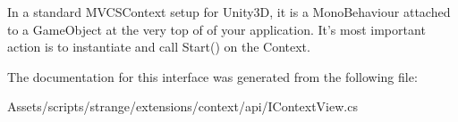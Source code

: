 In a standard M\-V\-C\-S\-Context setup for Unity3\-D, it is a Mono\-Behaviour attached to a Game\-Object at the very top of of your application. It's most important action is to instantiate and call {\ttfamily Start()} on the Context. 

The documentation for this interface was generated from the following file\-:\begin{DoxyCompactItemize}
\item 
Assets/scripts/strange/extensions/context/api/I\-Context\-View.\-cs\end{DoxyCompactItemize}

